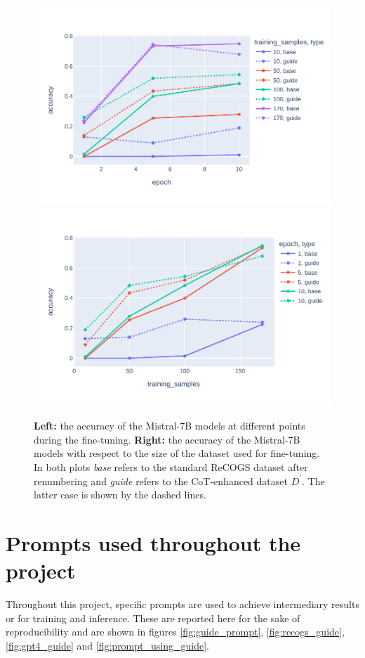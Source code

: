 \documentclass[11pt]{article}
\begin{document}
    \begin{figure}
        \centering
        \includegraphics[width=0.45\linewidth]{../plots/accuracy_vs_epoch.pdf}
        \includegraphics[width=0.45\linewidth]{../plots/accuracy_vs_data.pdf}
        \caption{
        \textbf{Left:} the accuracy of the Mistral-7B models at different points during the fine-tuning.
        \textbf{Right:} the accuracy of the Mistral-7B models with respect to the size of the dataset used for fine-tuning.\\
        In both plots \emph{base} refers to the standard ReCOGS dataset after renumbering and \emph{guide}
        refers to the CoT-enhanced dataset $D^\prime$. The latter case is shown by the dashed lines.
        }
        \label{fig:acc_vs_data_and_epoch}
    \end{figure}

    

    \appendix


    \section{Prompts used throughout the project}\label{sec:appendix}
    Throughout this project, specific prompts are used to achieve intermediary results or for training and inference.
    These are reported here for the sake of reproducibility and are shown in figures \ref{fig:guide_prompt},
    \ref{fig:recogs_guide}, \ref{fig:gpt4_guide} and \ref{fig:prompt_using_guide}.
\end{document}
